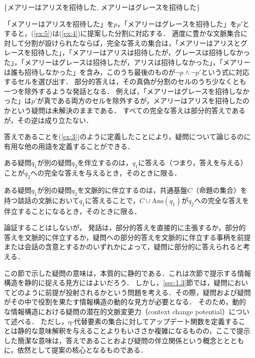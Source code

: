 \documentclass{goken}
\newcommand{\term}[2]{\textsf{#1}（#2）}
\newcommand{\ori}[1]{\noindent\textcolor[gray]{0.7}{\fontsize{8pt}{8pt}\selectfont{\textsf{(p.~#1)}}} }
\begin{document}
\begin{exe}
	\ex\label{ex:7}
	\{メアリーはアリスを招待した, メアリーはグレースを招待した\}%
\end{exe}
\noindent
「メアリーはアリスを招待した」を$p$，「メアリーはグレースを招待した」を$p'$とすると，(\ref{ex:5})は(\ref{ex:4})に提案した分割に対応する．%
適度に豊かな文脈集合に対して分割が設けられたならば，完全な答えの集合は，「メアリーはアリスとグレースを招待した」，「メアリーはアリスは招待したが，グレースは招待しなかった」，「メアリーはグレースは招待したが，アリスは招待しなかった」，「メアリーは誰も招待しなかった」を含み，このうち最後のものが$\neg p \wedge \neg p'$という式に対応するセルを選び出す．%
部分的答えは，その真偽が分割のセルのうち少なくとも一つを除外するような発話となる．
例えば，「メアリーはグレースを招待しなかった」は$p'$が真である両方のセルを除外するが，メアリーはアリスを招待したのかという疑問は未解決のままである．%
すべての完全な答えは部分的答えであるが，その逆は成り立たない．

答えであることを(\ref{ex:3})のように定義したことにより，疑問について論じるのに有用な他の用語を定義することができる．

\begin{exe}
	\ex\label{ex:8}
	ある疑問$q_1$が別の疑問$q_2$を\textsf{伴立する}のは，$q_1$に答える（つまり，答えを与える）ことが$q_2$への完全な答えを与えるとき，そのときに限る．\citep[cf.][16]{GroenendijkStokhof1984}
\end{exe}

\begin{exe}
	\ex\label{ex:9}
	ある疑問$q_1$が別の疑問$q_2$を\textsf{文脈的に伴立する}のは，共通基盤$C$（命題の集合）を持つ談話の文脈において$q_1$に答えることで，$C \cup \text{Ans}(q_1)$が$q_2$への完全な答えを伴立することになるとき，そのときに限る．
\end{exe}
\noindent
論証することはしないが，
発話は，部分的答えを直接的に主張するか，部分的答えを文脈的に伴立するか，疑問への部分的答えを文脈的に伴立する事柄を前提または会話の含意とするかのいずれかによって，疑問に部分的に答えられると考える．

この節で示した疑問の意味は，本質的に静的である．これは次節で提示する情報構造を静的に捉える見方にはよいだろう．
しかし，\ref{sec:1.3}節では，疑問においてどのように前提が投射されるかという問題を考える．その際，疑問および疑問がその中で役割を果たす情報構造の動的な見方が必要となる．
\ori{13}
そのため，動的な情報構造における疑問の\term{潜在的文脈変更力}{context change potential}について述べる．
ただし，q-代替要素の集合に対してアップデート関数を定義することは静的な意味解釈を与えることよりもいささか複雑になるものの，ここで提示した簡潔な意味は，答えであることおよび疑問の伴立関係という概念ととともに，依然として提案の核心となるものである．
\end{document}
